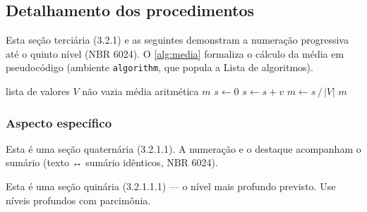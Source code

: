 \subsection{Detalhamento dos procedimentos}
\label{sec:detalhamento}

Esta seção terciária (3.2.1) e as seguintes demonstram a numeração progressiva
até o quinto nível (NBR 6024). O \autoref{alg:media} formaliza o cálculo da média
em pseudocódigo (ambiente \texttt{algorithm}, que popula a Lista de algoritmos).

\begin{algorithm}[!htb]
  \caption{Cálculo da média aritmética.}
  \label{alg:media}
  \begin{algorithmic}[1]
    \Require lista de valores $V$ não vazia
    \Ensure média aritmética $m$
    \State $s \gets 0$
      \State $s \gets s + v$
    \EndFor
    \State $m \gets s \,/\, |V|$
    \State \Return $m$
  \end{algorithmic}
\end{algorithm}

\subsubsection{Aspecto específico}
\label{sec:aspecto}
Esta é uma seção quaternária (3.2.1.1). A numeração e o destaque acompanham o
sumário (texto ↔ sumário idênticos, NBR 6024).

\label{sec:item}
Esta é uma seção quinária (3.2.1.1.1) --- o nível mais profundo previsto. Use
níveis profundos com parcimônia.
